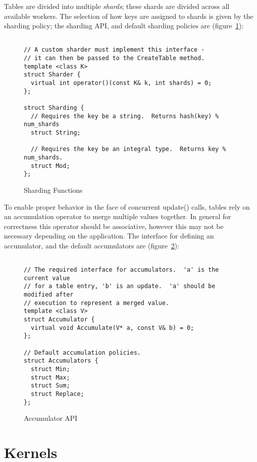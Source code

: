 \documentclass[10pt]{article}
\begin{document}
Tables are divided into multiple {\em shards}; these shards are divided across
all available workers.  The selection of how keys are assigned to shards is
given by the sharding policy; the sharding API, and default sharding policies
are (figure~\ref{fig:shardingapi}):

\begin{figure}[h!]
\begin{lstlisting}

// A custom sharder must implement this interface - 
// it can then be passed to the CreateTable method.
template <class K>
struct Sharder {
  virtual int operator()(const K& k, int shards) = 0;
};

struct Sharding {
  // Requires the key be a string.  Returns hash(key) % num_shards
  struct String;
  
  // Requires the key be an integral type.  Returns key % num_shards.
  struct Mod;
};
\end{lstlisting}
\caption{\sffamily Sharding Functions \label{fig:shardingapi}}
\end{figure}

To enable proper behavior in the face of concurrent update() calls, tables rely
on an accumulation operator to merge multiple values together.  In general for
correctness this operator should be associative, however this may not be
necessary depending on the application.  The interface for defining an
accumulator, and the default accumulators are (figure~\ref{fig:accumapi}):

\begin{figure}[h!]
\begin{lstlisting}  

// The required interface for accumulators.  'a' is the current value
// for a table entry, 'b' is an update.  'a' should be modified after
// execution to represent a merged value. 
template <class V>
struct Accumulator {
  virtual void Accumulate(V* a, const V& b) = 0;
};

// Default accumulation policies.
struct Accumulators {
  struct Min;
  struct Max;
  struct Sum;
  struct Replace;
};

\end{lstlisting}
\caption{\sffamily Accumulator API \label{fig:accumapi}}
\end{figure}

\section{Kernels}
\end{document}
